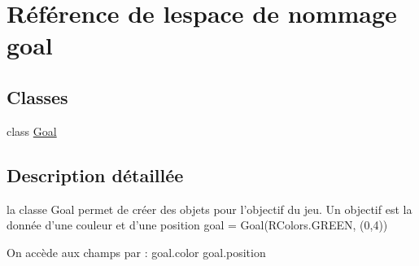 \hypertarget{namespacegoal}{}\section{Référence de l\textquotesingle{}espace de nommage goal}
\label{namespacegoal}
\subsection*{Classes}
\begin{DoxyCompactItemize}
\item 
class \hyperlink{classgoal_1_1Goal}{Goal}
\end{DoxyCompactItemize}


\subsection{Description détaillée}
\begin{DoxyVerb}la classe Goal permet de créer des objets pour l'objectif du jeu.
Un objectif est la donnée d'une couleur et d'une position
    goal = Goal(RColors.GREEN, (0,4))

    On accède aux champs par :
    goal.color
    goal.position
\end{DoxyVerb}
 